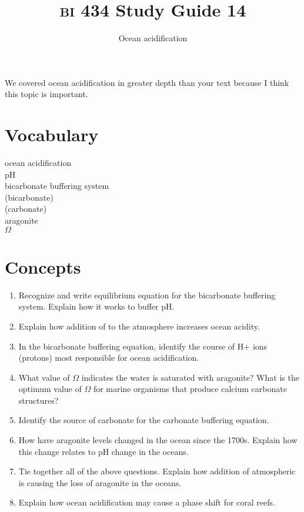 \documentclass[letterpaper]{tufte-handout}
\title{{\scshape bi} 434 Study Guide 14}
\author{Ocean acidification}
\date{} %
\begin{document}
\maketitle	%


We covered ocean acidification in greater depth than your text because I think this topic is important.

\section*{Vocabulary}
\begin{multicols}{2}
ocean acidification \\
pH \\
bicarbonate buffering system \\
 (bicarbonate) \\
 (carbonate) \\
aragonite \\
$\Omega$ \\
\end{multicols}
\section*{Concepts}

\begin{enumerate}

\item Recognize and write equilibrium equation for the bicarbonate buffering system. Explain how it works to buffer pH.

\item Explain how addition of  to the atmosphere increases ocean acidity.

\item In the bicarbonate buffering equation, identify the course of {H+} ions (protons) most responsible for ocean acidification.
 
\item What value of $\Omega$ indicates the water is saturated with aragonite? What is the optimum value of $\Omega$ for marine organisms that produce calcium carbonate structures?

\item Identify the source of carbonate for the carbonate buffering equation.

\item How have aragonite levels changed in the ocean since the 1700s. Explain how this change relates to pH change in the oceans.

\item Tie together all of the above questions. Explain how addition of atmospheric  is causing the loss of aragonite in the oceans.

\item Explain how ocean acidification may cause a phase shift for coral reefs.



\end{enumerate}
\end{document}
